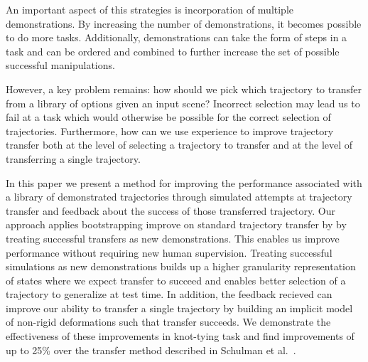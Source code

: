 An important aspect of this strategies is incorporation of multiple demonstrations. 
By increasing the number of demonstrations, it becomes possible to do more
tasks. Additionally, demonstrations can take the form of steps in a task and can be
ordered and combined to further increase the set of possible successful manipulations.

However, a key problem remains: how should we pick which trajectory to transfer
from a library of options given an input scene? Incorrect selection may lead us
to fail at a task which would otherwise be possible for the correct selection of 
trajectories. Furthermore, how can we use experience to improve trajectory transfer 
both at the level of selecting a trajectory to transfer and at the level of transferring
a single trajectory.

In this paper we present a method for improving the performance associated with
a library of demonstrated trajectories through simulated attempts at trajectory
transfer and feedback about the success of those transferred trajectory. Our approach
applies bootstrapping improve on standard trajectory transfer by 
by treating successful transfers as new demonstrations. This enables us improve
performance without requiring new human supervision. Treating successful simulations
as new demonstrations builds up a higher granularity representation of states where
we expect transfer to succeed and enables better selection of a trajectory to 
generalize at test time. In addition, the feedback recieved can improve our ability
to transfer a single trajectory by building an implicit model of non-rigid 
deformations such that transfer succeeds. We demonstrate the effectiveness 
of these improvements in knot-tying task and find improvements  
of up to 25\% over the transfer method described in Schulman et al.~\cite{Schulmanetal_ISRR2013}.







